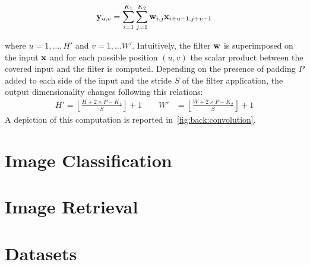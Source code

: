 \begin{equation}
    \mathbf{y}_{u,v} = \sum_{i=1}^{K_1} \sum_{j=1}^{K_2} \mathbf{w}_{i,j} \mathbf{x}_{i+u-1,j+v-1}
\end{equation}

where $u = 1, \dots, H'$ and $v = 1, \dots W'$.
Intuitively, the filter $\mathbf{w}$ is superimposed on the input $\mathbf{x}$ and for each possible position $(u,v)$ the scalar product between the covered input and the filter is computed.
Depending on the presence of padding $P$ added to each side of the input and the stride $S$ of the filter application, the output dimensionality changes following this relations:
\begin{align*}
    H' = \left \lfloor \frac{H + 2 \times P - K_1}{S} \right \rfloor + 1 \qquad
    W' &= \left \lfloor \frac{W + 2 \times P - K_2}{S} \right \rfloor + 1
\end{align*}
A depiction of this computation is reported in~\ref{fig:back:convolution}.




\section{Image Classification}
\label{sec:back:image-classification}




\section{Image Retrieval}
\label{sec:back:image-retrieval}


\section{Datasets}
\label{sec:back:datasets}
